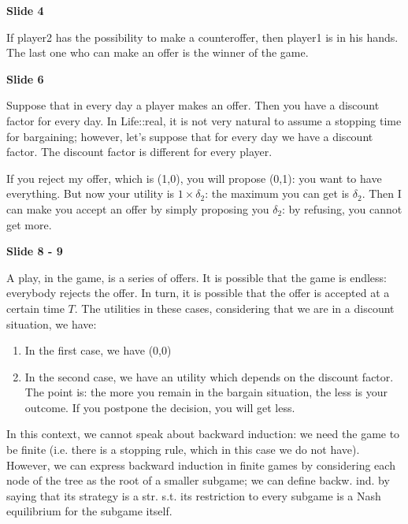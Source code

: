 
%



\bigskip
\noindent \textbf{Slide 4}

\noindent If player2 has the possibility to make a counteroffer, then player1 
is in his hands. The last one who can make an offer is the winner of the game.

\bigskip
\noindent \textbf{Slide 6}

\noindent Suppose that in every day a player makes an offer. Then you have a 
discount factor for every day. In Life::real, it is not very natural to 
assume a stopping time for bargaining; however, let's suppose that for every 
day we have a discount factor. The discount factor is different for 
every player. 

\noindent If you reject my offer, which is (1,0), you will propose (0,1): you 
want to have everything. But now your utility is $1 \times \delta_2$: the 
maximum you can get is $\delta_2$. Then I can make you accept an offer by 
simply proposing you $\delta_2$: by refusing, you cannot get more. 

\bigskip
\noindent \textbf{Slide 8 - 9}

\noindent A play, in the game, is a series of offers. It is possible that the 
game is endless: everybody rejects the offer. In turn, it is possible that the 
offer is accepted at a certain time $T$. The utilities in these cases, 
considering that we are in a discount situation, we have:
\begin{enumerate}
	\item In the first case, we have (0,0)
	\item In the second case, we have an utility which depends on the discount 
	factor. The point is: the more you remain in the bargain situation, the 
	less is your outcome. If you postpone the decision, you will get less.
\end{enumerate}

\noindent In this context, we cannot speak about backward induction: we need 
the game to be finite (i.e. there is a stopping rule, which in this case we 
do not have). However, we can express backward induction in finite games by 
considering each node of the tree as the root of a smaller subgame; we can 
define backw. ind. by saying that its strategy is a str. s.t. its restriction 
to every subgame is a Nash equilibrium for the subgame itself.

